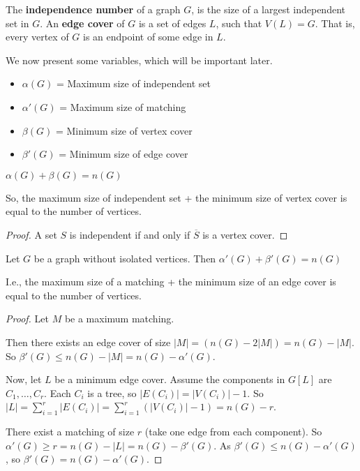 The \textbf{independence number} of a graph $G$, is the size of a largest independent set in $G$. An \textbf{edge cover} of $G$ is a set of edges $L$, such that $V(L) = G$. That is, every vertex of $G$ is an endpoint of some edge in $L$.

We now present some variables, which will be important later.
\begin{itemize}
	\item \(\alpha(G)\) = Maximum size of independent set
	\item \(\alpha'(G)\) = Maximum size of matching
	\item \(\beta(G)\) = Minimum size of vertex cover
	\item \(\beta'(G)\) = Minimum size of edge cover
\end{itemize}

\begin{lemma}
	\(\alpha(G) + \beta(G) = n(G)\)
\end{lemma}

So, the maximum size of independent set + the minimum size of vertex cover is equal to the number of vertices.

\begin{proof}
	A set $S$ is independent if and only if $\overline{S}$ is a vertex cover.
\end{proof}

\begin{theorem}
	Let $G$ be a graph without isolated vertices. Then $\alpha'(G) + \beta'(G) = n(G)$
\end{theorem}

I.e., the maximum size of a matching + the minimum size of an edge cover is equal to the number of vertices.

\begin{proof}
	Let $M$ be a maximum matching.

	Then there exists an edge cover of size $|M| = (n(G) - 2|M|) = n(G) - |M|$. So \(\beta'(G) \le n(G) - |M| = n(G) - \alpha'(G)\).

	Now, let $L$ be a minimum edge cover. Assume the components in $G[L]$ are $C_{1}, \ldots, C_r$. Each $C_{i}$ is a tree, so $|E(C_{i})| = |V(C_{i})|-1$. So $|L| = \sum_{i=1}^r |E(C_{i})| = \sum_{i=1}^r (|V(C_{i})|-1) = n(G)-r$.

	There exist a matching of size $r$ (take one edge from each component). So \(\alpha'(G) \ge r = n(G) - |L| = n(G) - \beta'(G)\). As $\beta'(G) \le n(G) - \alpha'(G)$, so \(\beta'(G) = n(G)-\alpha'(G)\).
\end{proof}

